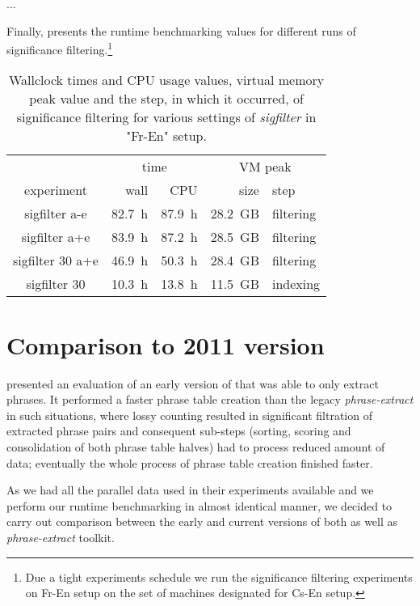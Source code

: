 ...

Finally,  presents the runtime benchmarking
values for different runs of significance filtering.\footnote{Due a tight experiments
schedule we run the significance filtering experiments on Fr-En setup on the set of
machines designated for Cs-En setup.}


\begin{table}[ht]
\centering
\begin{tabular}{ | c | r r | r l | }
\hline
 & \multicolumn{2}{|c|}{time} & \multicolumn{2}{|c|}{VM peak} \\
experiment & wall & CPU & size & step \\
\hline
\hline
sigfilter a-e     & 82.7~h & 87.9~h & 28.2~GB & filtering \\
sigfilter a+e     & 83.9~h & 87.2~h & 28.5~GB & filtering \\
sigfilter 30 a+e  & 46.9~h & 50.3~h & 28.4~GB & filtering \\
sigfilter 30      & 10.3~h & 13.8~h & 11.5~GB & indexing \\
\hline
\end{tabular}
\caption{\label{fr-en-sigfilter-runtime-benchmarks}
Wallclock times and CPU usage values, virtual memory peak value and the step,
in which it occurred, of significance filtering for various settings of \emph{sigfilter} in "Fr-En" setup.}
\end{table}

\section{Comparison to 2011 version}
\label{sec:cu-bojar-results}

\citet{przywara:eppex} presented an evaluation of an early version of \eppex{}
that was able to only extract phrases. It performed a faster phrase
table creation than the legacy \emph{phrase-extract} in such situations,
where lossy counting resulted in significant filtration of extracted phrase
pairs and consequent sub-steps (sorting, scoring and consolidation of both
phrase table halves) had to process reduced amount of data;
eventually the whole process of phrase table creation finished faster.

As we had all the parallel data used in their experiments available and
we perform our runtime benchmarking in almost identical manner,
we decided to carry out comparison between the early and current versions of
both \eppex{} as well as \emph{phrase-extract} toolkit.

